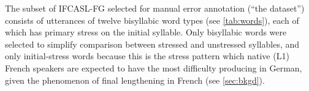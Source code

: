 \documentclass[a4paper]{article}
\begin{document}
	The subset of IFCASL-FG selected for manual error annotation (``the dataset'') consists of utterances of twelve bisyllabic word types (see \cref{tab:words}), each of which has primary stress on the initial syllable. 
	Only bisyllabic words were selected to simplify comparison between stressed and unstressed syllables, and only initial-stress words because this is the stress pattern which native (L1) French speakers are expected to have the most difficulty producing in German, given the phenomenon of final lengthening in French (see \cref{sec:bkgd}).
	
\end{document}
